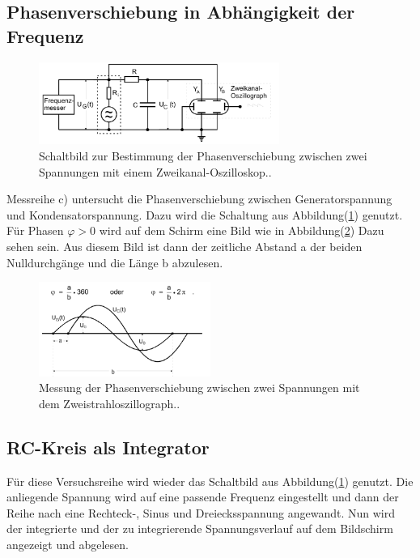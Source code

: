     \subsection{Phasenverschiebung in Abhängigkeit der Frequenz}
        \begin{figure}[H]
            \centering
            \includegraphics[width=0.7\textwidth]{latex/images/Phasenverschiebung.PNG}
            \caption{Schaltbild zur Bestimmung der Phasenverschiebung zwischen zwei Spannungen mit einem Zweikanal-Oszilloskop.\protect \cite{V353}.}
            \label{img:Phase}
        \end{figure}
        \noindent Messreihe c) untersucht die Phasenverschiebung zwischen Generatorspannung und Kondensatorspannung. Dazu wird die Schaltung aus 
        Abbildung(\ref{img:Phase}) genutzt. Für Phasen $\varphi > 0$ wird auf dem Schirm eine Bild wie in Abbildung(\ref{img:Zweist}) Dazu sehen sein.
        Aus diesem Bild ist dann der zeitliche Abstand a der beiden Nulldurchgänge und die Länge b abzulesen.



        \begin{figure}[H]
            \centering
            \includegraphics[width=0.5\textwidth]{latex/images/Zweistrahloszillograph.PNG}
            \caption{Messung der Phasenverschiebung zwischen zwei Spannungen mit dem Zweistrahloszillograph.\protect \cite{V353}.}
            \label{img:Zweist}
        \end{figure}

    \subsection{RC-Kreis als Integrator}

        \noindent Für diese Versuchsreihe wird wieder das Schaltbild aus Abbildung(\ref{img:Phase}) genutzt. Die anliegende Spannung wird auf 
        eine passende Frequenz eingestellt und dann der Reihe nach eine Rechteck-, Sinus und Dreiecksspannung angewandt. Nun wird der 
        integrierte und der zu integrierende Spannungsverlauf auf dem Bildschirm angezeigt und abgelesen.



        
        
